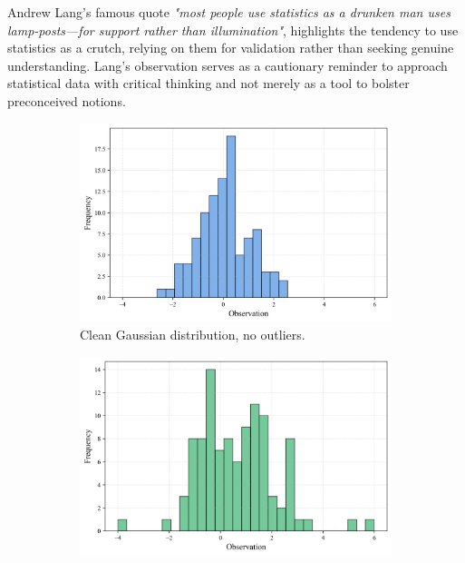 \documentclass{book}
\begin{document}
\medskip

Andrew Lang's famous quote \textit{"most people use statistics as a drunken man uses lamp-posts—for support rather than illumination"}, highlights the tendency to use statistics as a crutch, relying on them for validation rather than seeking genuine understanding. Lang's observation serves as a cautionary reminder to approach statistical data with critical thinking and not merely as a tool to bolster preconceived notions.

\begin{figure}[ht]
    \centering
    \begin{subfigure}[b]{0.48\textwidth}
        \centering
        \includegraphics[width=\textwidth, height=0.7\textwidth]{figures/chapter1/histogram_1.png}
        \caption{Clean Gaussian distribution, no outliers.}
        \label{fig:histogram1}
    \end{subfigure}
    \hfill
    \begin{subfigure}[b]{0.48\textwidth}
        \centering
        \includegraphics[width=\textwidth, height=0.7\textwidth]{figures/chapter1/histogram_2.png}

\end{subfigure}
\end{figure}
\end{document}
